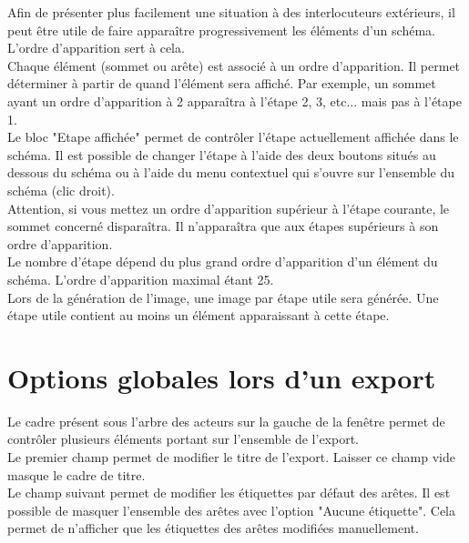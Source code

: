 Afin de présenter plus facilement une situation à des interlocuteurs extérieurs, il peut être utile de faire apparaître progressivement les éléments d'un schéma. L'ordre d'apparition sert à cela.\\

Chaque élément (sommet ou arête) est associé à un ordre d'apparition. Il permet déterminer à partir de quand l'élément sera affiché. Par exemple, un sommet ayant un ordre d'apparition à 2 apparaîtra à l'étape 2, 3, etc... mais pas à l'étape 1.\\

Le bloc "Etape affichée" permet de contrôler l'étape actuellement affichée dans le schéma. Il est possible de changer l'étape à l'aide des deux boutons situés au dessous du schéma ou à l'aide du menu contextuel qui s'ouvre sur l'ensemble du schéma (clic droit).\\

Attention, si vous mettez un ordre d'apparition supérieur à l'étape courante, le sommet concerné disparaîtra. Il n'apparaîtra que aux étapes supérieurs à son ordre d'apparition.\\

Le nombre d'étape dépend du plus grand ordre d'apparition d'un élément du schéma. L'ordre d'apparition maximal étant 25.\\

Lors de la génération de l'image, une image par étape utile sera générée. Une étape utile contient au moins un élément apparaissant à cette étape.\\

\section{Options globales lors d'un export}
\label{globalExport}
Le cadre présent sous l'arbre des acteurs sur la gauche de la fenêtre permet de contrôler plusieurs éléments portant sur l'ensemble de l'export.\\

Le premier champ permet de modifier le titre de l'export. Laisser ce champ vide masque le cadre de titre.\\

Le champ suivant permet de modifier les étiquettes par défaut des arêtes. Il est possible de masquer l'ensemble des arêtes avec l'option "Aucune étiquette". Cela permet de n'afficher que les étiquettes des arêtes modifiées manuellement.\\

